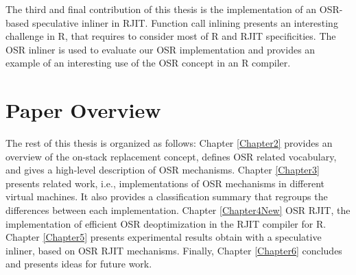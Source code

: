 The third and final contribution of this thesis is the implementation of an OSR-based speculative inliner in RJIT.
Function call inlining presents an interesting challenge in R, that requires to consider most of R and RJIT specificities.
The OSR inliner is used to evaluate our OSR implementation and provides an example of an interesting use of the OSR concept in an R compiler.\\

\section{Paper Overview}

The rest of this thesis is organized as follows: Chapter \ref{Chapter2} provides an overview of the on-stack replacement concept, defines OSR related vocabulary, and gives a high-level description of OSR mechanisms.
Chapter \ref{Chapter3} presents related work, i.e., implementations of OSR mechanisms in different virtual machines. It also provides a classification summary that regroups the differences between each implementation.
Chapter \ref{Chapter4New} OSR RJIT, the implementation of efficient OSR deoptimization in the RJIT compiler for R.
Chapter \ref{Chapter5} presents experimental results obtain with a speculative inliner, based on OSR RJIT mechanisms.
Finally, Chapter \ref{Chapter6} concludes and presents ideas for future work.\\ 





